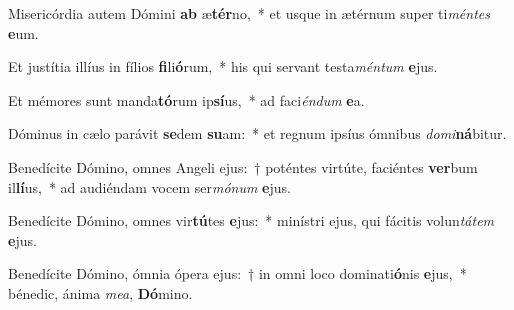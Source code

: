 \item Misericórdia autem Dómini \textbf{ab} æ\textbf{tér}no,~* et usque in ætérnum super ti\textit{mén}\textit{tes} \textbf{e}um.
\item Et justítia illíus in fílios \textbf{fi}li\textbf{ó}rum,~* his qui servant testa\textit{mén}\textit{tum} \textbf{e}jus.
\item Et mémores sunt manda\textbf{tó}rum ip\textbf{sí}us,~* ad faci\textit{én}\textit{dum} \textbf{e}a.
\item Dóminus in cælo parávit \textbf{se}dem \textbf{su}am:~* et regnum ipsíus ómnibus \textit{do}\textit{mi}\textbf{ná}bitur.
\item Benedícite Dómino, omnes Angeli ejus:~† poténtes virtúte, faciéntes \textbf{ver}bum il\textbf{lí}us,~* ad audiéndam vocem ser\textit{mó}\textit{num} \textbf{e}jus.
\item Benedícite Dómino, omnes vir\textbf{tú}tes \textbf{e}jus:~* minístri ejus, qui fácitis volun\textit{tá}\textit{tem} \textbf{e}jus.
\item Benedícite Dómino, ómnia ópera ejus:~† in omni loco dominati\textbf{ó}nis \textbf{e}jus,~* bénedic, ánima \textit{me}\textit{a}, \textbf{Dó}mino.
